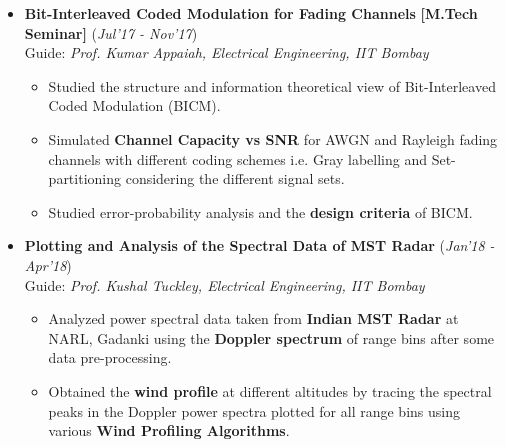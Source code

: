 \documentclass[10pt]{article}
\begin{document}
\begin{itemize}[leftmargin=0.4cm]
	\vspace{-0.2cm}	
	
\newpage	
\item \textbf{Bit-Interleaved Coded Modulation for Fading Channels
} \textbf{[M.Tech Seminar]}
\hfill{(\textit{Jul'17 - Nov'17})}\\
Guide: \textit{Prof. Kumar Appaiah, Electrical Engineering, IIT Bombay}\\\vspace{-0.68cm}
	\begin{itemize}
	\item Studied the structure and information theoretical view of Bit-Interleaved Coded Modulation (BICM).\vspace{-0.1cm}
	\item Simulated \textbf{Channel Capacity vs SNR} for AWGN and Rayleigh fading channels with different coding schemes i.e. Gray labelling and Set-partitioning considering the different signal sets.\vspace{-0.1cm}
	\item Studied error-probability analysis and the \textbf{design criteria} of BICM.

	\end{itemize}

	\vspace{-0.2cm}
	
\item \textbf{Plotting and Analysis of the Spectral Data of MST Radar}
\hfill{(\textit{Jan'18 - Apr'18})}\\
Guide: \textit{Prof. Kushal Tuckley, Electrical Engineering, IIT Bombay}\\\vspace{-0.68cm}
	\begin{itemize}
	\item Analyzed power spectral data taken from \textbf{Indian MST Radar} at NARL, Gadanki using the \textbf{Doppler spectrum} of range bins after some data pre-processing.\vspace{-0.1cm}
	\item Obtained the \textbf{wind profile} at different altitudes by tracing the spectral peaks in the Doppler power spectra plotted for all range bins using various \textbf{Wind Profiling Algorithms}.
	\end{itemize}
	

\end{itemize}
\end{document}
